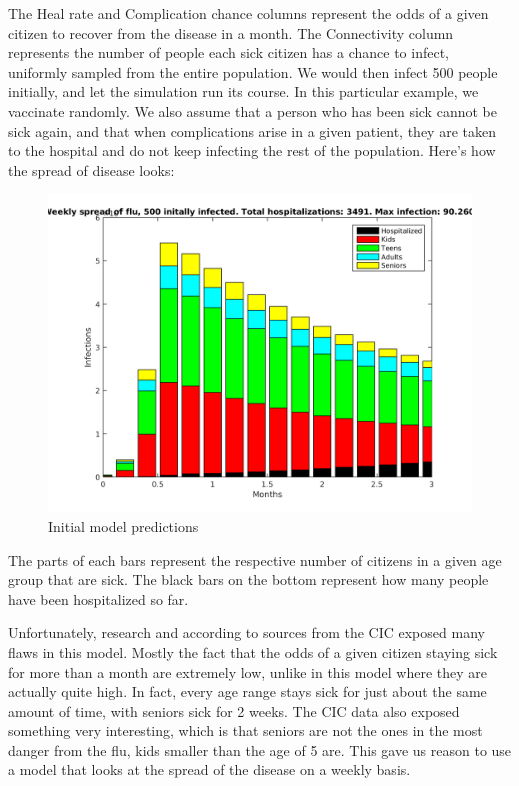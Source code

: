 \documentclass[titlepage]{article}
\begin{document}
\par The Heal rate and Complication chance columns represent the odds of a given citizen to recover from the disease in a month. The Connectivity column represents the number of people each sick citizen has a chance to infect, uniformly sampled from the entire population. We would then infect 500 people initially, and let the simulation run its course. In this particular example, we vaccinate randomly. We also assume that a person who has been sick cannot be sick again, and that when complications arise in a given patient, they are taken to the hospital and do not keep infecting the rest of the population. Here's how the spread of disease looks:
\begin{figure}[h!]
\includegraphics[width=\textwidth]{figures/Naive-model.png}
\caption{Initial model predictions}
\end{figure}
The parts of each bars represent the respective number of citizens in a given age group that are sick. The black bars on the bottom represent how many people have been hospitalized so far.
\par Unfortunately, research and according to sources from the CIC \cite{CIC-stats} \cite{CIC-qa} exposed many flaws in this model. Mostly the fact that the odds of a given citizen staying sick for more than a month are extremely low, unlike in this model where they are actually quite high. In fact, every age range stays sick for just about the same amount of time, with seniors sick for 2 weeks. The CIC data also exposed something very interesting, which is that seniors are not the ones in the most danger from the flu, kids smaller than the age of 5 are. This gave us reason to use a model that looks at the spread of the disease on a weekly basis.
\end{document}
